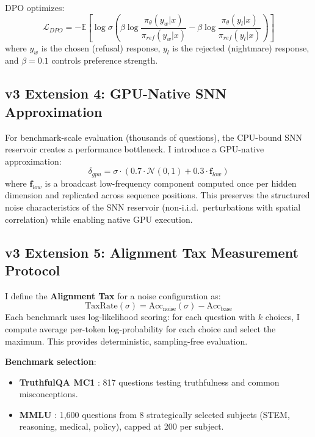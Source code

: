 \documentclass[11pt,a4paper]{article}
\begin{document}
DPO optimizes:
\begin{equation}
    \mathcal{L}_{DPO} = -\mathbb{E}\left[\log \sigma\left(\beta \log \frac{\pi_\theta(y_w | x)}{\pi_{ref}(y_w | x)} - \beta \log \frac{\pi_\theta(y_l | x)}{\pi_{ref}(y_l | x)}\right)\right]
\end{equation}
where $y_w$ is the chosen (refusal) response, $y_l$ is the rejected (nightmare) response, and $\beta = 0.1$ controls preference strength.

\subsection{v3 Extension 4: GPU-Native SNN Approximation}

For benchmark-scale evaluation (thousands of questions), the CPU-bound SNN reservoir creates a performance bottleneck. I introduce a GPU-native approximation:
\begin{equation}
    \delta_{gpu} = \sigma \cdot (0.7 \cdot \mathcal{N}(0, 1) + 0.3 \cdot \mathbf{f}_{low})
\end{equation}
where $\mathbf{f}_{low}$ is a broadcast low-frequency component computed once per hidden dimension and replicated across sequence positions. This preserves the structured noise characteristics of the SNN reservoir (non-i.i.d.\ perturbations with spatial correlation) while enabling native GPU execution.

\subsection{v3 Extension 5: Alignment Tax Measurement Protocol}

I define the \textbf{Alignment Tax} for a noise configuration as:
\begin{equation}
    \text{TaxRate}(\sigma) = \text{Acc}_{\text{noise}}(\sigma) - \text{Acc}_{\text{base}}
\end{equation}
Each benchmark uses log-likelihood scoring: for each question with $k$ choices, I compute average per-token log-probability for each choice and select the maximum. This provides deterministic, sampling-free evaluation.

\textbf{Benchmark selection}:
\begin{itemize}
    \item \textbf{TruthfulQA MC1} \cite{lin2022truthfulqa}: 817 questions testing truthfulness and common misconceptions.
    \item \textbf{MMLU} \cite{hendrycks2021mmlu}: 1,600 questions from 8 strategically selected subjects (STEM, reasoning, medical, policy), capped at 200 per subject.
\end{itemize}
\end{document}
